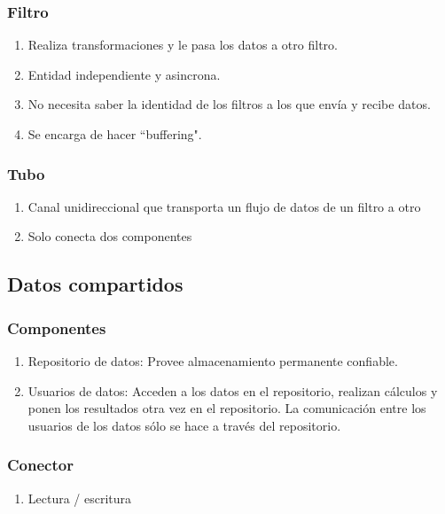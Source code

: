     \subsubsection{Filtro}
    \begin{enumerate}[-]
      \setlength\itemsep{0mm}
      \item Realiza transformaciones y le pasa los datos a otro filtro.
      \item Entidad independiente y asincrona.
      \item No necesita saber la identidad de los filtros a los que envía y recibe datos.
      \item Se encarga de hacer ``buffering".
    \end{enumerate}

    \subsubsection{Tubo}
    \begin{enumerate}[-]
      \setlength\itemsep{0mm}
      \item Canal unidireccional que transporta un flujo de datos de un filtro a otro
      \item Solo conecta dos componentes
    \end{enumerate}


  \subsection{Datos compartidos}

    \subsubsection{Componentes}
    \begin{enumerate}[-]
      \setlength\itemsep{0mm}
      \item Repositorio de datos: Provee almacenamiento permanente confiable.
      \item Usuarios de datos: Acceden a los datos en el repositorio, realizan cálculos y ponen los resultados otra vez
      en el repositorio. La comunicación entre los usuarios de los datos sólo se hace a través del repositorio.
    \end{enumerate}

    \subsubsection{Conector}
    \begin{enumerate}[-]
      \setlength\itemsep{0mm}
      \item Lectura / escritura
    \end{enumerate}

